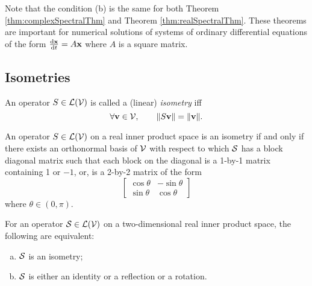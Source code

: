 \begin{rem}
  Note that the condition (b) is the same
  for both Theorem \ref{thm:complexSpectralThm}
  and Theorem \ref{thm:realSpectralThm}.
  These theorems are important
   for numerical solutions of systems of ordinary differential
   equations
   of the form $\frac{\mathrm{d} \mathbf{x}}{\mathrm{d} t} = A \mathbf{x}$
   where $A$ is a square matrix.
\end{rem}


\subsection{Isometries}

\begin{defn}
  \label{def:linearIsometry}
  An operator $S\in {\cal L}({\cal V})$
  is called a (linear) \emph{isometry} iff
  \begin{equation}
    \label{eq:linearIsometry}
    \forall \mathbf{v}\in {\cal V}, \qquad \|S \mathbf{v}\| = \|\mathbf{v}\|.
  \end{equation}
\end{defn}

\begin{thm}
  \label{thm:isometryFormsInRealIPspaces}
  An operator $S\in {\cal L}({\cal V})$
  on a real inner product space
  is an isometry
  if and only if
  there exists an orthonormal basis of ${\cal V}$
  with respect to which ${\cal S}$ has a block diagonal matrix
  such that each block on the diagonal is a 1-by-1 matrix
  containing 1 or $-1$,
  or, is a 2-by-2 matrix of the form
  \begin{equation}
    \label{eq:isometryFormsInRealIPspaces}
    \begin{bmatrix}
      \cos\theta & -\sin\theta
      \\
      \sin\theta & \cos \theta
    \end{bmatrix}
  \end{equation}
  where $\theta\in (0,\pi)$.
\end{thm}

\begin{coro}
  \label{coro:isometryTypes}
  For an operator ${\cal S}\in {\cal L}({\cal V})$
  on a two-dimensional real inner product space, 
  the following are equivalent:
  \begin{enumerate}[(a)]\itemsep0em
  \item ${\cal S}$ is an isometry;
  \item ${\cal S}$ is either an identity or a reflection or a rotation.
  \end{enumerate}
\end{coro}

